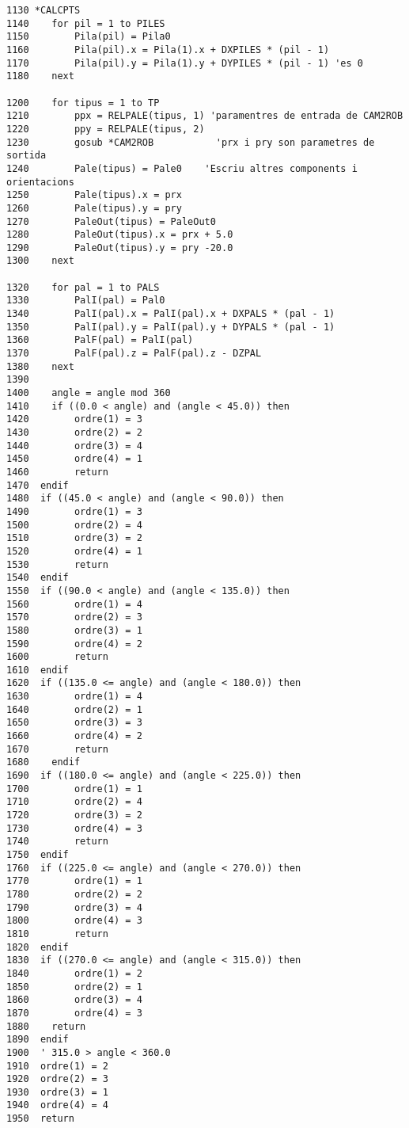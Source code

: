 \begin{verbatim}
1130 *CALCPTS
1140    for pil = 1 to PILES
1150        Pila(pil) = Pila0
1160        Pila(pil).x = Pila(1).x + DXPILES * (pil - 1)
1170        Pila(pil).y = Pila(1).y + DYPILES * (pil - 1) 'es 0
1180    next

1200    for tipus = 1 to TP
1210        ppx = RELPALE(tipus, 1) 'paramentres de entrada de CAM2ROB
1220        ppy = RELPALE(tipus, 2)
1230        gosub *CAM2ROB           'prx i pry son parametres de sortida
1240        Pale(tipus) = Pale0    'Escriu altres components i orientacions
1250        Pale(tipus).x = prx
1260        Pale(tipus).y = pry
1270        PaleOut(tipus) = PaleOut0
1280        PaleOut(tipus).x = prx + 5.0
1290        PaleOut(tipus).y = pry -20.0
1300    next

1320    for pal = 1 to PALS
1330        PalI(pal) = Pal0
1340        PalI(pal).x = PalI(pal).x + DXPALS * (pal - 1)
1350        PalI(pal).y = PalI(pal).y + DYPALS * (pal - 1)
1360        PalF(pal) = PalI(pal)
1370        PalF(pal).z = PalF(pal).z - DZPAL
1380    next
1390 	
1400    angle = angle mod 360
1410 	if ((0.0 < angle) and (angle < 45.0)) then
1420        ordre(1) = 3
1430        ordre(2) = 2
1440        ordre(3) = 4
1450        ordre(4) = 1
1460        return
1470  endif
1480  if ((45.0 < angle) and (angle < 90.0)) then 
1490        ordre(1) = 3
1500        ordre(2) = 4
1510        ordre(3) = 2
1520        ordre(4) = 1
1530        return
1540  endif
1550  if ((90.0 < angle) and (angle < 135.0)) then
1560        ordre(1) = 4
1570        ordre(2) = 3
1580        ordre(3) = 1
1590        ordre(4) = 2
1600        return
1610  endif
1620  if ((135.0 <= angle) and (angle < 180.0)) then
1630        ordre(1) = 4
1640        ordre(2) = 1
1650        ordre(3) = 3
1660        ordre(4) = 2
1670 		return
1680 	endif
1690  if ((180.0 <= angle) and (angle < 225.0)) then 
1700        ordre(1) = 1
1710        ordre(2) = 4
1720        ordre(3) = 2
1730        ordre(4) = 3
1740        return
1750  endif
1760  if ((225.0 <= angle) and (angle < 270.0)) then
1770        ordre(1) = 1
1780        ordre(2) = 2
1790        ordre(3) = 4
1800        ordre(4) = 3
1810        return
1820  endif
1830  if ((270.0 <= angle) and (angle < 315.0)) then 
1840        ordre(1) = 2
1850        ordre(2) = 1
1860        ordre(3) = 4
1870        ordre(4) = 3
1880 	return
1890  endif
1900  ' 315.0 > angle < 360.0
1910  ordre(1) = 2
1920  ordre(2) = 3
1930  ordre(3) = 1
1940  ordre(4) = 4
1950  return
\end{verbatim}

